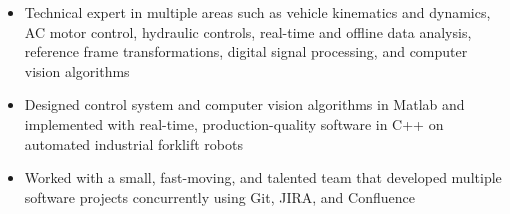 	\begin{itemize} [leftmargin = \itemmargin]
		\item Technical expert in multiple areas such as vehicle kinematics and dynamics, AC motor control, hydraulic controls, real-time and offline data analysis, reference frame transformations, digital signal processing, and computer vision algorithms
			
		\item Designed control system and computer vision algorithms in Matlab and implemented with real-time, production-quality software in C++ on automated industrial forklift robots
		
		\item Worked with a small, fast-moving, and talented team that developed multiple software projects concurrently using Git, JIRA, and Confluence
		
	\end{itemize} \\